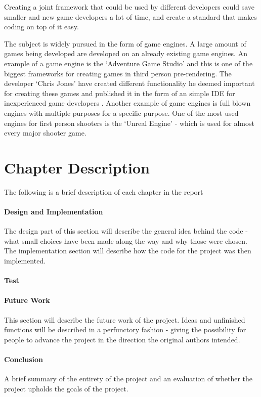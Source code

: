 Creating a joint framework that could be used by different developers could save smaller and new game developers a lot of time, and create a standard that makes coding on top of it easy. 

The subject is widely pursued in the form of game engines. A large amount of games being developed are developed on an already existing game engines. An example of a game engine is the `Adventure Game Studio' and this is one of the biggest frameworks for creating games in third person pre-rendering. The developer `Chris Jones' have created different functionality he deemed important for creating these games and published it in the form of an simple IDE for inexperienced game developers \cite{adv-game}. Another example of game engines is full blown engines with multiple purposes for a specific purpose. One of the most used engines for first person shooters is the `Unreal Engine' - which is used for almost every major shooter game.


\section{Chapter Description}
The following is a brief description of each chapter in the report

\paragraph{Design and Implementation}
The design part of this section will describe the general idea behind the code - what small choices have been made along the way and why those were chosen. The implementation section will describe how the code for the project was then implemented.
\paragraph{Test}

\paragraph{Future Work}
This section will describe the future work of the project. Ideas and unfinished functions will be described in a perfunctory fashion - giving the possibility for people to advance the project in the direction the original authors intended.
\paragraph{Conclusion}
A brief summary of the entirety of the project and an evaluation of whether the project upholds the goals of the project.